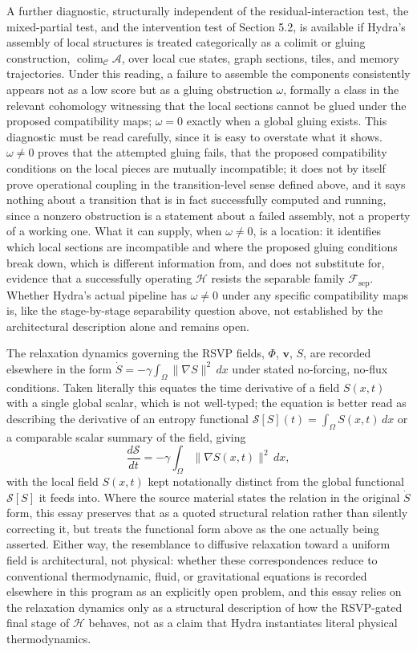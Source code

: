 \documentclass[11pt]{article}
\begin{document}
A further diagnostic, structurally independent of the residual-interaction test, the mixed-partial test, and the intervention test of Section 5.2, is available if Hydra's assembly of local structures is treated categorically as a colimit or gluing construction, $\operatorname{colim}_{\mathcal{C}} \mathcal{A}$, over local cue states, graph sections, tiles, and memory trajectories. Under this reading, a failure to assemble the components consistently appears not as a low score but as a gluing obstruction $\omega$, formally a class in the relevant cohomology witnessing that the local sections cannot be glued under the proposed compatibility maps; $\omega = 0$ exactly when a global gluing exists. This diagnostic must be read carefully, since it is easy to overstate what it shows. $\omega \neq 0$ proves that the attempted gluing fails, that the proposed compatibility conditions on the local pieces are mutually incompatible; it does not by itself prove operational coupling in the transition-level sense defined above, and it says nothing about a transition that is in fact successfully computed and running, since a nonzero obstruction is a statement about a failed assembly, not a property of a working one. What it can supply, when $\omega \neq 0$, is a location: it identifies which local sections are incompatible and where the proposed gluing conditions break down, which is different information from, and does not substitute for, evidence that a successfully operating $\mathcal{H}$ resists the separable family $\mathcal{F}_{\mathrm{sep}}$. Whether Hydra's actual pipeline has $\omega \neq 0$ under any specific compatibility maps is, like the stage-by-stage separability question above, not established by the architectural description alone and remains open.

The relaxation dynamics governing the RSVP fields, $\Phi$, $\mathbf{v}$, $S$, are recorded elsewhere in the form $\dot{S} = -\gamma \int_{\Omega} \lVert \nabla S \rVert^2 \, dx$ under stated no-forcing, no-flux conditions. Taken literally this equates the time derivative of a field $S(x,t)$ with a single global scalar, which is not well-typed; the equation is better read as describing the derivative of an entropy functional $\mathscr{S}[S](t) = \int_\Omega S(x,t)\,dx$ or a comparable scalar summary of the field, giving
\[
\frac{d\mathscr{S}}{dt} = -\gamma \int_\Omega \lVert \nabla S(x,t) \rVert^2 \, dx,
\]
with the local field $S(x,t)$ kept notationally distinct from the global functional $\mathscr{S}[S]$ it feeds into. Where the source material states the relation in the original $\dot{S}$ form, this essay preserves that as a quoted structural relation rather than silently correcting it, but treats the functional form above as the one actually being asserted. Either way, the resemblance to diffusive relaxation toward a uniform field is architectural, not physical: whether these correspondences reduce to conventional thermodynamic, fluid, or gravitational equations is recorded elsewhere in this program as an explicitly open problem, and this essay relies on the relaxation dynamics only as a structural description of how the RSVP-gated final stage of $\mathcal{H}$ behaves, not as a claim that Hydra instantiates literal physical thermodynamics.
\end{document}
